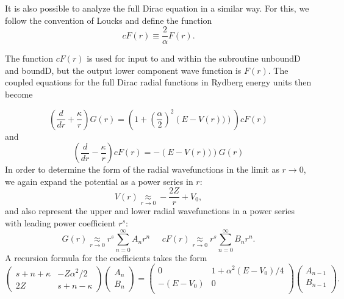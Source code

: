 \documentclass[11pt]{article}
\begin{document}
It is also possible to analyze the full Dirac equation in a similar
way.    For this, we follow the convention of Loucks\cite{Loucks:1965}
and define the function 
\begin{equation}
cF(r) \equiv \frac{2}{\alpha} F(r).
\end{equation}

The function $cF(r)$ is used for input to and within the subroutine
unboundD and boundD, but the output lower component wave function is
$F(r)$.
The coupled equations for the full Dirac radial functions in
Rydberg energy units then become

\begin{equation} \label{cFG}
\left( \frac{d}{dr} + \frac{\kappa}{r} \right) G(r) =
       \left( 1 +\left( \frac{\alpha}{2} \right)^2 \left(E - V(r))\right)
           \right) cF(r)
\end{equation}
and
\begin{equation}
\left( \frac{d}{dr} - \frac{\kappa}{r} \right) cF(r) =
  -\left(E - V(r))\right) G(r)
\end{equation} 
In order to determine the form of the radial wavefunctions in the
limit as $r \rightarrow 0$, we again expand the potential as a power
series in $r$:
\begin{equation}
V(r) \underset{r \rightarrow 0}{\approx} -\frac{2Z}{r}+V_0, \label{zero}
\end{equation}
and also represent the upper and lower radial wavefunctions in
a power series with leading power coefficient $r^s$:
\begin{equation}
G(r)  \underset{r \rightarrow 0}{\approx} r^s \sum_{n=0}^{\infty} A_n r^n \;\;\;\;\;
cF(r)  \underset{r \rightarrow 0}{\approx} r^s \sum_{n=0}^{\infty} B_n r^n.
\end{equation}
A recursion formula  for the coefficients takes the form
\begin{equation}
\left( \begin{array}{cc} s+n+\kappa & -Z \alpha^2/2 \\
                        2Z & s+n-\kappa  \end{array} \right)
\left( \begin{array}{c} A_n \\
                       B_n \end{array} \right)
  = \left( \begin{array}{cc} 
                0 &      1+\alpha^2(E-V_0)/4 \\
                  -(E-V_0)  & 0 \\  \end{array}  \right)
   \left( \begin{array}{c} A_{n-1} \\ B_{n-1} \\ \end{array} \right).
\label{rec1}
\end{equation}
\end{document}
